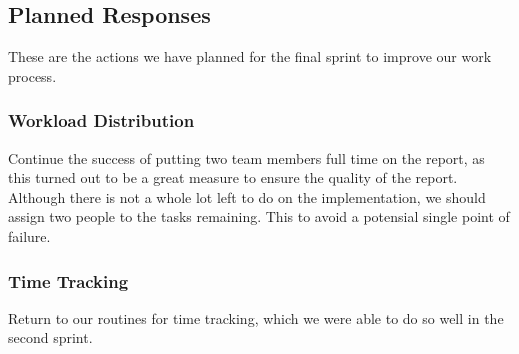 \subsection{Planned Responses}
These are the actions we have planned for the final sprint to improve our work process.

\subsubsection{Workload Distribution}
Continue the success of putting two team members full time on the report, as this turned out to be a great measure to ensure the quality of the report. Although there is not a whole lot left to do on the implementation, we should assign two people to the tasks remaining. This to avoid a potensial single point of failure.

\subsubsection{Time Tracking}
Return to our routines for time tracking, which we were able to do so well in the second sprint.


